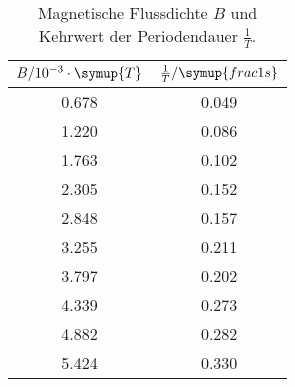 \begin{table}[!htp]
\centering
\caption{Magnetische Flussdichte $B$ und Kehrwert der Periodendauer $\frac{1}{T}$.}
\label{tab:praezess2}
\begin{tabular}{c c}
\toprule
{$B / 10^{-3} \cdot \symup{T}$} & {$\frac{1}{T} / \symup{frac{1}{s}}$} \\
\midrule
0.678 & 0.049 \\
1.220 & 0.086 \\
1.763 & 0.102 \\
2.305 & 0.152 \\
2.848 & 0.157 \\
3.255 & 0.211 \\
3.797 & 0.202 \\
4.339 & 0.273 \\
4.882 & 0.282 \\
5.424 & 0.330 \\
\bottomrule
\end{tabular}
\end{table}